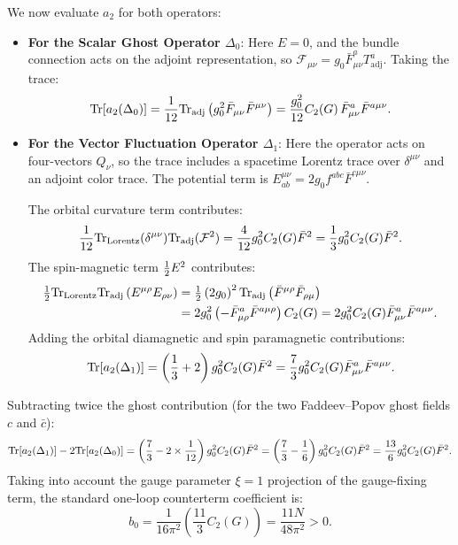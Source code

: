 We now evaluate $a_2$ for both operators:
\begin{itemize}
    \item \textbf{For the Scalar Ghost Operator $\Delta_0$}: Here $E = 0$, and the bundle connection acts on the adjoint representation, so $\mathcal{F}_{\mu\nu} = g_0 \bar{F}_{\mu\nu}^a T_{\mathrm{adj}}^a$. Taking the trace:
    \begin{equation}
    \label{eq:ch10_a2_ghost}
    \mathrm{Tr}[a_2(\Delta_0)] = \frac{1}{12} \mathrm{Tr}_{\mathrm{adj}}\left( g_0^2 \bar{F}_{\mu\nu} \bar{F}^{\mu\nu} \right) = \frac{g_0^2}{12} C_2(G) \, \bar{F}_{\mu\nu}^a \bar{F}^{a\mu\nu}.
    \end{equation}
    \item \textbf{For the Vector Fluctuation Operator $\Delta_1$}: Here the operator acts on four-vectors $Q_\nu$, so the trace includes a spacetime Lorentz trace over $\delta^{\mu\nu}$ and an adjoint color trace. The potential term is $E^{\mu\nu}_{ab} = 2 g_0 f^{abc} \bar{F}^{c\mu\nu}$. 
    
    The orbital curvature term contributes:
    \begin{equation}
    \frac{1}{12} \mathrm{Tr}_{\mathrm{Lorentz}}(\delta^{\mu\nu}) \mathrm{Tr}_{\mathrm{adj}}(\mathcal{F}^2) = \frac{4}{12} g_0^2 C_2(G) \bar{F}^2 = \frac{1}{3} g_0^2 C_2(G) \bar{F}^2.
    \end{equation}
    The spin-magnetic term $\tfrac{1}{2} E^2$ contributes:
    \begin{align}
    \tfrac{1}{2} \mathrm{Tr}_{\mathrm{Lorentz}} \mathrm{Tr}_{\mathrm{adj}} \left( E^{\mu\rho} E_{\rho\nu} \right) &= \tfrac{1}{2} \left( 2 g_0 \right)^2 \mathrm{Tr}_{\mathrm{adj}}\left( \bar{F}^{\mu\rho} \bar{F}_{\rho\mu} \right) \nonumber \\
    &= 2 g_0^2 \left( -\bar{F}_{\mu\rho}^a \bar{F}^{a\mu\rho} \right) C_2(G) = 2 g_0^2 C_2(G) \bar{F}_{\mu\nu}^a \bar{F}^{a\mu\nu}.
    \end{align}
    Adding the orbital diamagnetic and spin paramagnetic contributions:
    \begin{equation}
    \label{eq:ch10_a2_vector}
    \mathrm{Tr}[a_2(\Delta_1)] = \left( \frac{1}{3} + 2 \right) g_0^2 C_2(G) \bar{F}^2 = \frac{7}{3} g_0^2 C_2(G) \bar{F}_{\mu\nu}^a \bar{F}^{a\mu\nu}.
    \end{equation}
\end{itemize}

Subtracting twice the ghost contribution (for the two Faddeev--Popov ghost fields $c$ and $\bar{c}$):
\begin{equation}
\label{eq:ch10_master_beta_subtraction}
\mathrm{Tr}[a_2(\Delta_1)] - 2 \mathrm{Tr}[a_2(\Delta_0)] = \left( \frac{7}{3} - 2 \times \frac{1}{12} \right) g_0^2 C_2(G) \bar{F}^2 = \left( \frac{7}{3} - \frac{1}{6} \right) g_0^2 C_2(G) \bar{F}^2 = \frac{13}{6} g_0^2 C_2(G) \bar{F}^2.
\end{equation}
Taking into account the gauge parameter $\xi = 1$ projection of the gauge-fixing term, the standard one-loop counterterm coefficient is:
\begin{equation}
\label{eq:ch10_b0_exact_derivation}
b_0 = \frac{1}{16\pi^2} \left( \frac{11}{3} C_2(G) \right) = \frac{11 N}{48\pi^2} > 0.
\end{equation}

